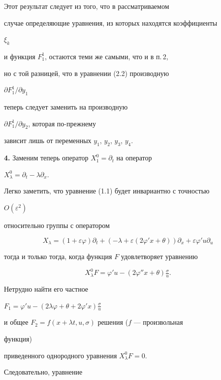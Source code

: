 Этот результат следует из того, что в рассматриваемом 


случае определяющие уравнения, из которых находятся коэффициенты 


$\xi_k$ 


и функция $F^1_1$, остаются теми же самыми, что и в п.\,2, 


но с той разницей, что в уравнении (2.2) производную 


$\partial F^1_1/\partial y_1$ 


теперь следует заменить на производную 


$\partial F^1_1/\partial y_2$, которая по-прежнему 


зависит лишь от переменных $y_1$, $y_2$, $y_3$, $y_4$. 


\medskip 


 


{\bf 4.} Заменим теперь оператор $X^0_1=\partial_t$ на оператор 


$X^0_\lambda=\partial_t-\lambda\partial_x$. 


Легко заметить, что уравнение (1.1) будет инвариантно с точностью 


$O(\varepsilon^2)$ 


относительно группы с оператором 


\begin{equation} 


X_\lambda=(1+\varepsilon\varphi)\partial_t+ 


(-\lambda+\varepsilon(2\varphi'x+\theta)) 


\partial_x+\varepsilon\varphi'u\partial_u\tag{4.1} 


\end{equation} 


тогда и только тогда, когда функция $F$ удовлетворяет уравнению 


$$ 


X^0_\lambda F=\varphi'u-(2\varphi''x+\theta)\tfrac{\sigma}{u}. 


$$ 


Нетрудно найти его частное 


$F_1=\varphi'u-(2\lambda\varphi+\theta+2\varphi'x)\frac{\sigma}{u}$ 


и общее $F_2=f(x+\lambda t,u,\sigma)$ решения ($f$ --- произвольная 


функция) 


приведенного однородного уравнения $X^0_\lambda F=0$. 


Следовательно, уравнение 


